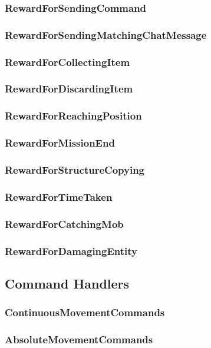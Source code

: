 \documentclass[11pt]{article} %
\begin{document}
\subsubsection{RewardForSendingCommand}
\subsubsection{RewardForSendingMatchingChatMessage}
\subsubsection{RewardForCollectingItem}
\subsubsection{RewardForDiscardingItem}
\subsubsection{RewardForReachingPosition}
\subsubsection{RewardForMissionEnd}
\subsubsection{RewardForStructureCopying}
\subsubsection{RewardForTimeTaken}
\subsubsection{RewardForCatchingMob}
\subsubsection{RewardForDamagingEntity}

\subsection{Command Handlers}

\subsubsection{ContinuousMovementCommands}
\subsubsection{AbsoluteMovementCommands}
\end{document}
